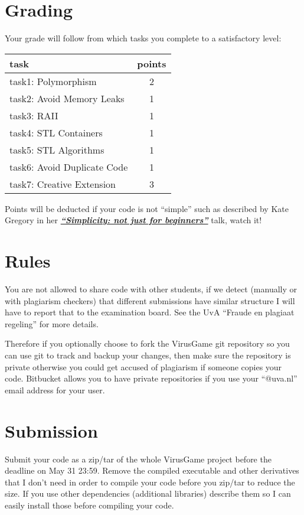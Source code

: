 \documentclass[12pt]{article}
\newcommand*{\link}[2]{\href{#1}{\color{blue}\textbf{\textit{#2}}}}
\begin{document}
\section{Grading}
Your grade will follow from which tasks you complete to a satisfactory
level:
\begin{center}
\begin{tabular}{ |l|c| } 
  \hline
  \textbf{task}               &  \textbf{points}\\ \hline
  task1: Polymorphism         &               2 \\
  task2: Avoid Memory Leaks   &               1 \\
  task3: RAII                 &               1 \\
  task4: STL Containers       &               1 \\
  task5: STL Algorithms       &               1 \\
  task6: Avoid Duplicate Code &               1 \\
  task7: Creative Extension   &               3 \\
  \hline
\end{tabular}
\end{center}

Points will be deducted if your code is not ``simple'' such as
described by Kate Gregory in her
\link{https://www.youtube.com/watch?v=O50qTuM5OT0} {``Simplicity: not
  just for beginners''} talk, watch it!

\section{Rules}
You are not allowed to share code with other students, if we detect
(manually or with plagiarism checkers) that different submissions have
similar structure I will have to report that to the examination
board. See the UvA ``Fraude en plagiaat regeling'' for more details.

Therefore if you optionally choose to fork the VirusGame git
repository so you can use git to track and backup your changes, then
make sure the repository is private otherwise you could get accused of
plagiarism if someone copies your code. Bitbucket allows you to have
private repositories if you use your ``@uva.nl'' email address for your
user.

\section{Submission}
Submit your code as a zip/tar of the whole VirusGame project before
the deadline on May 31 23:59. Remove the compiled executable and other
derivatives that I don't need in order to compile your code before you
zip/tar to reduce the size. If you use other dependencies (additional
libraries) describe them so I can easily install those before
compiling your code.
\end{document}
